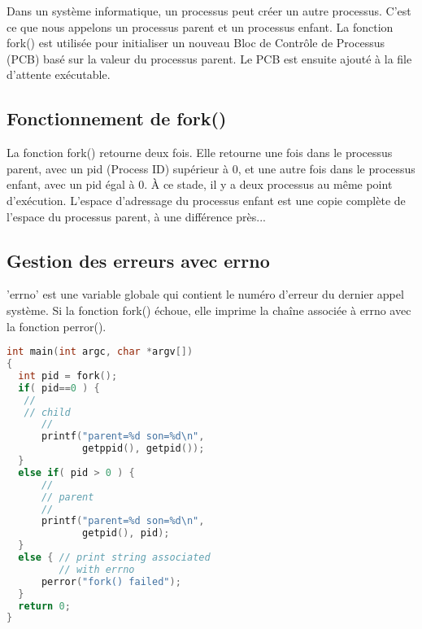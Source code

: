 \documentclass[12pt]{report}
\begin{document}
Dans un système informatique, un processus peut créer un autre processus. C'est ce que nous appelons un processus parent et un processus enfant. La fonction fork() est utilisée pour initialiser un nouveau Bloc de Contrôle de Processus (PCB) basé sur la valeur du processus parent. Le PCB est ensuite ajouté à la file d'attente exécutable. 

\subsection{Fonctionnement de fork()} 

La fonction fork() retourne deux fois. Elle retourne une fois dans le processus parent, avec un pid (Process ID) supérieur à 0, et une autre fois dans le processus enfant, avec un pid égal à 0. À ce stade, il y a deux processus au même point d'exécution. L'espace d'adressage du processus enfant est une copie complète de l'espace du processus parent, à une différence près... 

\subsection{Gestion des erreurs avec errno} 

'errno' est une variable globale qui contient le numéro d'erreur du dernier appel système. Si la fonction fork() échoue, elle imprime la chaîne associée à errno avec la fonction perror().
\begin{lstlisting}[language=C]
int main(int argc, char *argv[])
{
  int pid = fork();
  if( pid==0 ) { 
   //
   // child
      //
      printf("parent=%d son=%d\n",
             getppid(), getpid());
  }
  else if( pid > 0 ) {
      //
      // parent
      //
      printf("parent=%d son=%d\n",
             getpid(), pid);
  }
  else { // print string associated
         // with errno   
      perror("fork() failed"); 
  }
  return 0;
}
\end{lstlisting}
\end{document}
